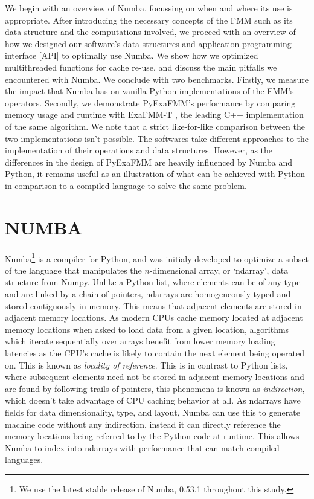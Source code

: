 \documentclass{IEEEcsmag}
\begin{document}
We begin with an overview of Numba, focussing on when and where its use is appropriate. After introducing the necessary concepts of the FMM such as its data structure and the computations involved, we proceed with an overview of how we designed our software's data structures and application programming interface [API] to optimally use Numba. We show how we optimized multithreaded functions for cache re-use, and discuss the main pitfalls we encountered with Numba. We conclude with two benchmarks. Firstly, we measure the impact that Numba has on vanilla Python implementations of the FMM's operators. Secondly, we demonstrate PyExaFMM's performance by comparing memory usage and runtime with ExaFMM-T \cite{Wang2021}, the leading C++ implementation of the same algorithm. We note that a strict like-for-like comparison between the two implementations isn't possible. The softwares take different approaches to the implementation of their operations and data structures. However, as the differences in the design of PyExaFMM are heavily influenced by Numba and Python, it remains useful as an illustration of what can be achieved with Python in comparison to a compiled language to solve the same problem.

\section{NUMBA}

Numba\footnote{We use the latest stable release of Numba, 0.53.1 throughout this study.} is a compiler for Python, and was initialy developed to optimize a subset of the language that manipulates the $n$-dimensional array, or `ndarray', data structure from Numpy. Unlike a Python list, where elements can be of any type and are linked by a chain of pointers, ndarrays are homogeneously typed and stored contiguously in memory. This means that adjacent elements are stored in adjacent memory locations. As modern CPUs cache memory located at adjacent memory locations when asked to load data from a given location, algorithms which iterate sequentially over arrays benefit from lower memory loading latencies as the CPU's cache is likely to contain the next element being operated on. This is known as \textit{locality of reference}. This is in contrast to Python lists, where subsequent elements need not be stored in adjacent memory locations and are found by following trails of pointers, this phenomena is known as \textit{indirection}, which doesn't take advantage of CPU caching behavior at all. As ndarrays have fields for data dimensionality, type, and layout, Numba can use this to generate machine code without any indirection. instead it can directly reference the memory locations being referred to by the Python code at runtime. This allows Numba to index into ndarrays with performance that can match compiled languages.
\end{document}
